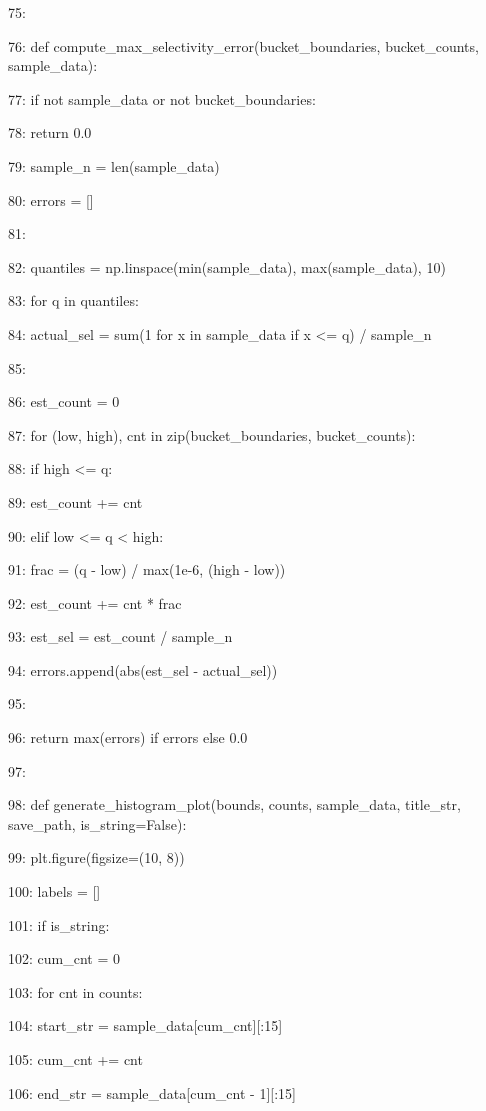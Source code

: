 \documentclass[11pt,a4paper]{article}
\begin{document}
75:

76: def compute\_max\_selectivity\_error(bucket\_boundaries, bucket\_counts, sample\_data):

77:     if not sample\_data or not bucket\_boundaries:

78:         return 0.0

79:     sample\_n = len(sample\_data)

80:     errors = []

81:

82:     quantiles = np.linspace(min(sample\_data), max(sample\_data), 10)

83:     for q in quantiles:

84:         actual\_sel = sum(1 for x in sample\_data if x <= q) / sample\_n

85:

86:         est\_count = 0

87:         for (low, high), cnt in zip(bucket\_boundaries, bucket\_counts):

88:             if high <= q:

89:                 est\_count += cnt

90:             elif low <= q < high:

91:                 frac = (q - low) / max(1e-6, (high - low))

92:                 est\_count += cnt * frac

93:         est\_sel = est\_count / sample\_n

94:         errors.append(abs(est\_sel - actual\_sel))

95:

96:     return max(errors) if errors else 0.0

97:

98: def generate\_histogram\_plot(bounds, counts, sample\_data, title\_str, save\_path, is\_string=False):

99:     plt.figure(figsize=(10, 8))

100:     labels = []

101:     if is\_string:

102:         cum\_cnt = 0

103:         for cnt in counts:

104:             start\_str = sample\_data[cum\_cnt][:15]

105:             cum\_cnt += cnt

106:             end\_str = sample\_data[cum\_cnt - 1][:15]
\end{document}
